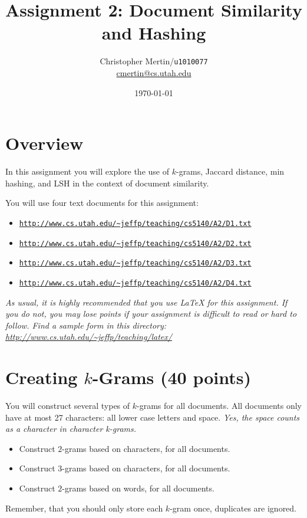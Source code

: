 \documentclass[11pt]{article}
\title{Assignment 2: Document Similarity and Hashing}
\author{Christopher Mertin/\verb~u1010077~\\\url{cmertin@cs.utah.edu}}
\date{\today}
\begin{document}
\maketitle


\section*{Overview}

In this assignment you will explore the use of $k$-grams, Jaccard distance, min hashing, and LSH in the context of document similarity.  

You will use four text documents for this assignment:
\begin{itemize} \denselist
\item \href{http://www.cs.utah.edu/~jeffp/teaching/cs5140/A2/D1.txt}{\texttt{http://www.cs.utah.edu/\~{}jeffp/teaching/cs5140/A2/D1.txt}}
\item \href{http://www.cs.utah.edu/~jeffp/teaching/cs5140/A2/D2.txt}{\texttt{http://www.cs.utah.edu/\~{}jeffp/teaching/cs5140/A2/D2.txt}}
\item \href{http://www.cs.utah.edu/~jeffp/teaching/cs5140/A2/D3.txt}{\texttt{http://www.cs.utah.edu/\~{}jeffp/teaching/cs5140/A2/D3.txt}}
\item \href{http://www.cs.utah.edu/~jeffp/teaching/cs5140/A2/D4.txt}{\texttt{http://www.cs.utah.edu/\~{}jeffp/teaching/cs5140/A2/D4.txt}}
\end{itemize}

\vspace{.1in}

\emph{As usual, it is highly recommended that you use LaTeX for this assignment.  If you do not, you may lose points if your assignment is difficult to read or hard to follow.  Find a sample form in this directory:
\url{http://www.cs.utah.edu/~jeffp/teaching/latex/}}


\section{Creating $k$-Grams (40 points)}

You will construct several types of $k$-grams for all documents.  All documents only have at most 27 characters: all lower case letters and space.    \emph{Yes, the space counts as a character in character k-grams.}
\begin{itemize} \denselist
\item[\s{[G1]}] Construct $2$-grams based on characters, for all documents.  
\item[\s{[G2]}] Construct $3$-grams based on characters, for all documents.
\item[\s{[G3]}] Construct $2$-grams based on words, for all documents.  
\end{itemize}
Remember, that you should only store each $k$-gram once, duplicates are ignored.  
\end{document}

